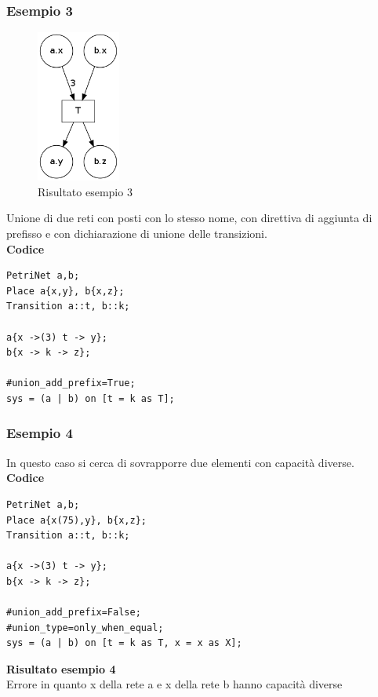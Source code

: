 \documentclass[italian,12pt]{book}
\begin{document}
\subsubsection{Esempio 3}
\begin{figure}[htb]
\centerline{\includegraphics[height=5cm]{img/unione_003.png}}
\caption{Risultato esempio 3}\label{fig:unione_003.png}
\end{figure}
Unione di due reti con posti con lo stesso nome, con direttiva di aggiunta
di prefisso e con dichiarazione di unione delle transizioni.\\
{\bf Codice}
\begin{verbatim}
PetriNet a,b;
Place a{x,y}, b{x,z};
Transition a::t, b::k;

a{x ->(3) t -> y};
b{x -> k -> z};

#union_add_prefix=True;
sys = (a | b) on [t = k as T];
\end{verbatim}


\subsubsection{Esempio 4}
In questo caso si cerca di sovrapporre due elementi con capacità diverse.\\
{\bf Codice}
\begin{verbatim}
PetriNet a,b;
Place a{x(75),y}, b{x,z};
Transition a::t, b::k;

a{x ->(3) t -> y};
b{x -> k -> z};

#union_add_prefix=False;
#union_type=only_when_equal;
sys = (a | b) on [t = k as T, x = x as X];
\end{verbatim}
{\bf Risultato esempio 4}\\
Errore in quanto x della rete a e x della rete b hanno capacità diverse
\end{document}
